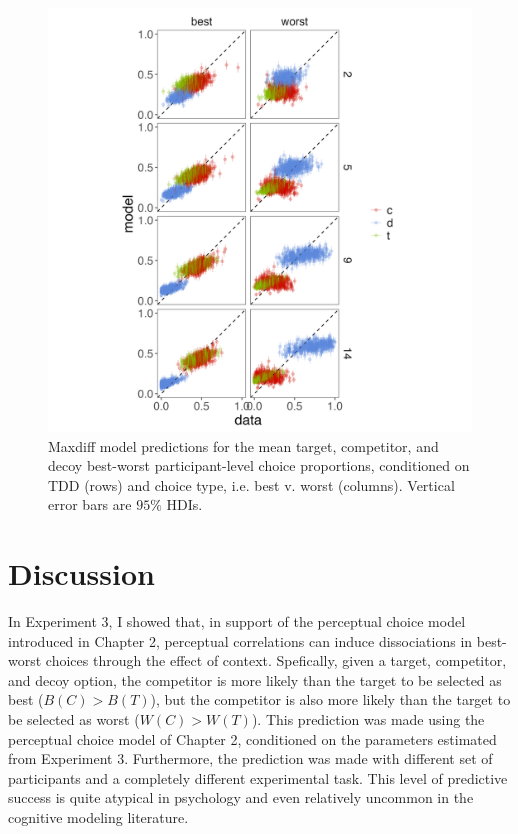 \begin{figure}
   \includegraphics[width=\linewidth]{figures/maxdiff_2_subjectmeans_model_v_data.jpeg}
   \caption{Maxdiff model predictions for the mean target, competitor, and decoy best-worst participant-level choice proportions, conditioned on TDD (rows) and choice type, i.e. best v. worst (columns). Vertical error bars are $95\%$ HDIs.}
   \label{fig:maxdiff_sub_preds}
\end{figure}

\section{Discussion}
In Experiment 3, I showed that, in support of the perceptual choice model introduced in Chapter 2, perceptual correlations can induce dissociations in best-worst choices through the effect of context. Spefically, given a target, competitor, and decoy option, the competitor is more likely than the target to be selected as best ($B(C)>B(T)$), but the competitor is also more likely than the target to be selected as worst ($W(C)>W(T)$). This prediction was made using the perceptual choice model of Chapter 2, conditioned on the parameters estimated from Experiment 3. Furthermore, the prediction was made with different set of participants and a completely different experimental task. This level of predictive success is quite atypical in psychology and even relatively uncommon in the cognitive modeling literature. 

